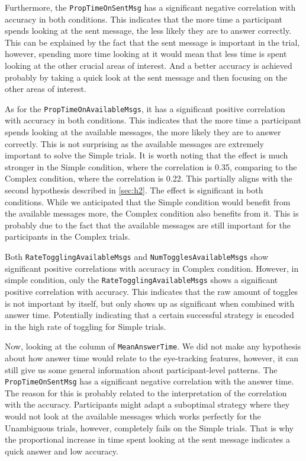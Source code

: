 Furthermore, the \texttt{PropTimeOnSentMsg} has a significant negative correlation with accuracy in both conditions. This indicates that the more time a participant spends looking at the sent message, the less likely they are to answer correctly. This can be explained by the fact that the sent message is important in the trial, however, spending more time looking at it would mean that less time is spent looking at the other crucial areas of interest. And a better accuracy is achieved probably by taking a quick look at the sent message and then focusing on the other areas of interest. 

As for the \texttt{PropTimeOnAvailableMsgs}, it has a significant positive correlation with accuracy in both conditions. This indicates that the more time a participant spends looking at the available messages, the more likely they are to answer correctly. This is not surprising as the available messages are extremely important to solve the Simple trials. It is worth noting that the effect is much stronger in the Simple condition, where the correlation is 0.35, comparing to the Complex condition, where the correlation is 0.22. This partially aligns with the second hypothesis described in \autoref{sec:h2}. The effect is significant in both conditions. While we anticipated that the Simple condition would benefit from the available messages more, the Complex condition also benefits from it. This is probably due to the fact that the available messages are still important for the participants in the Complex trials.

Both \texttt{RateTogglingAvailableMsgs} and \texttt{NumTogglesAvailableMsgs} show significant positive correlations with accuracy in Complex condition. However, in simple condition, only the \texttt{RateTogglingAvailableMsgs} shows a significant positive correlation with accuracy. This indicates that the raw amount of toggles is not important by itself, but only shows up as significant when combined with answer time. Potentially indicating that a certain successful strategy is encoded in the high rate of toggling for Simple trials.

\sloppy
Now, looking at the column of \texttt{MeanAnswerTime}. We did not make any hypothesis about how answer time would relate to the eye-tracking features, however, it can still give us some general information about participant-level patterns. The \texttt{PropTimeOnSentMsg} has a significant negative correlation with the answer time. The reason for this is probably related to the interpretation of the correlation with the accuracy. Participants might adapt a suboptimal strategy where they would not look at the available messages which works perfectly for the Unambiguous trials, however, completely fails on the Simple trials. That is why the proportional increase in time spent looking at the sent message indicates a quick answer and low accuracy. 
\sloppy

